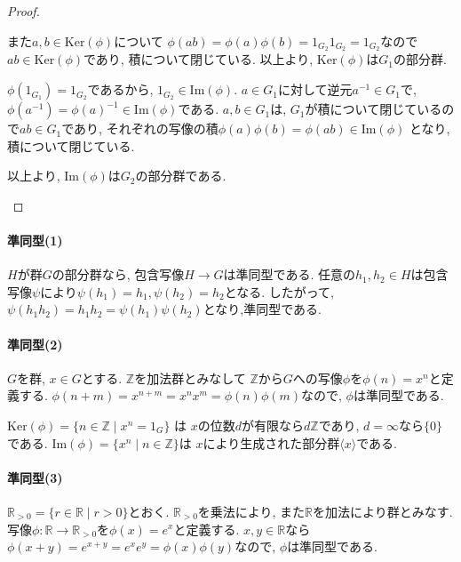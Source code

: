 \begin{proof}
\begin{enumerate}
		また$a,b \in \mathrm{Ker}(\phi)$について
		$\phi(ab) = \phi(a)\phi(b) = 1_{G_2}1_{G_2}=1_{G_2}$なので
		$ab \in \mathrm{Ker}(\phi)$であり, 積について閉じている. 
		以上より, $\mathrm{Ker}(\phi)$は$G_1$の部分群.

		$\phi(1_{G_1})=1_{G_2}$であるから, $1_{G_2} \in \mathrm{Im}(\phi)$.
		$ a \in G_1 $に対して逆元$a^{-1} \in G_1$で,
		$ \phi(a^{-1}) = \phi(a)^{-1} \in \mathrm{Im}(\phi)$である.
		$ a,b \in G_1$は, $G_1$が積について閉じているので$ab \in G_1$であり,
		それぞれの写像の積$ \phi(a)\phi(b) = \phi(ab) \in \mathrm{Im}(\phi)$
		となり, 積について閉じている.

		以上より, $ \mathrm{Im}(\phi) $は$G_2$の部分群である.
	\end{enumerate}
\end{proof}

\paragraph*{準同型(1)}
$H$が群$G$の部分群なら, 包含写像$H \to G$は準同型である.
任意の$h_1,h_2 \in H $は包含写像$\psi$により$ \psi(h_1) = h_1, \psi(h_2)=h_2 $となる.
したがって, $\psi(h_1 h_2)=h_1 h_2 = \psi(h_1)\psi(h_2)$となり,準同型である.
\newline

\paragraph*{準同型(2)}
$G$を群, $x \in G$とする. $\mathbb{Z}$を加法群とみなして
$\mathbb{Z}$から$G$への写像$\phi$を$\phi(n)=x^n$と定義する.
$\phi(n+m) = x^{n+m} = x^n x^m = \phi(n)\phi(m)$なので,
$\phi$は準同型である.

$\mathrm{Ker}(\phi) = \{ n \in \mathbb{Z} \mid x^n = 1_G \}$ は
$x$の位数$d$が有限なら$d\mathbb{Z}$であり, $d=\infty$なら$\{0\}$である.
$\mathrm{Im}(\phi)=\{x^n \mid n \in \mathbb{Z} \}$は
$x$により生成された部分群$\langle x \rangle$である.\newline

\paragraph*{準同型(3)}
$\mathbb{R}_{>0}=\{ r \in \mathbb{R} \mid r > 0\}$とおく.
$\mathbb{R}_{>0}$を乗法により, また$\mathbb{R}$を加法により群とみなす.
写像$\phi: \mathbb{R} \to \mathbb{R}_{>0}$を$\phi(x) = e^x$と定義する.
$ x,y \in \mathbb{R}$なら
$\phi(x+y) = e^{x+y} = e^x e^y = \phi(x)\phi(y)$なので,
$\phi$は準同型である.

